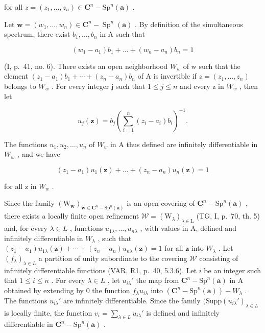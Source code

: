 for all \(z = (z_{1}, \ldots, z_{n}) \in \mathbf{C}^{n} - \mathrm{Sp}^{n}(\boldsymbol{a})\) .

Let \(\boldsymbol{w} = (w_{1}, \ldots, w_{n}) \in \mathbf{C}^{n} - \operatorname{Sp}^{n}(\boldsymbol{a})\) . By definition of the simultaneous spectrum, there exist \(b_{1}, \ldots, b_{n}\) in A such that

\[
(w _ {1} - a _ {1}) b _ {1} + \dots + (w _ {n} - a _ {n}) b _ {n} = 1
\]

(I, p.~41, no. 6). There exists an open neighborhood \(W_{w}\) of w such that the element \((z_{1}-a_{1})b_{1}+\cdots+(z_{n}-a_{n})b_{n}\) of A is invertible if \(z=(z_{1},\ldots,z_{n})\) belongs to \(W_{w}\) . For every integer j such that \(1\leqslant j\leqslant n\) and every z in \(W_{w}\) , then let

\[
u _ {j} (\boldsymbol {z}) = b _ {j} \left(\sum_ {i = 1} ^ {n} (z _ {i} - a _ {i}) b _ {i}\right) ^ {- 1}.
\]

The functions \(u_{1}, u_{2}, \ldots, u_{n}\) of \(W_{w}\) in A thus defined are infinitely differentiable in \(W_{w}\) , and we have

\[
(z _ {1} - a _ {1}) u _ {1} (\boldsymbol {z}) + \dots + (z _ {n} - a _ {n}) u _ {n} (\boldsymbol {z}) = 1
\]

for all z in \(W_{w}\) .

Since the family \((\mathrm{W}_{\boldsymbol{w}})_{\boldsymbol{w}\in\mathbf{C}^{n}-\mathrm{Sp}^{n}(\boldsymbol{a})}\) is an open covering of \(\mathbf{C}^{n}-\mathrm{Sp}^{n}(\boldsymbol{a})\) , there exists a locally finite open refinement \(\mathscr{W}=(\mathrm{W}_{\lambda})_{\lambda\in\mathrm{L}}\) (TG, I, p.~70, th. 5) and, for every \(\lambda\in L\) , functions \(u_{1\lambda},\ldots,u_{n\lambda}\) , with values in A, defined and infinitely differentiable in \(W_{\lambda}\) , such that \((z_{1}-a_{1})u_{1\lambda}(\boldsymbol{z})+\cdots+(z_{n}-a_{n})u_{n\lambda}(\boldsymbol{z})=1\) for all \(\boldsymbol{z}\) into \(W_{\lambda}\) . Let \((f_{\lambda})_{\lambda \in L}\) a partition of unity subordinate to the covering \(\mathscr{W}\) consisting of infinitely differentiable functions (VAR, R1, p.~40, 5.3.6). Let \(i\) be an integer such that \(1 \leqslant i \leqslant n\) . For every \(\lambda \in L\) , let \(u_{i\lambda}'\) the map from \(\mathbf{C}^n - \mathrm{Sp}^n(\boldsymbol{a})\) in A obtained by extending by 0 the function \(f_{\lambda}u_{i\lambda}\) into \((\mathbf{C}^n - \mathrm{Sp}^n(\boldsymbol{a})) - W_{\lambda}\) . The functions \(u_{i\lambda}'\) are infinitely differentiable. Since the family \((\mathrm{Supp}(u_{i\lambda}')_{\lambda \in L}\) is locally finite, the function \(v_i = \sum_{\lambda \in L} u_{i\lambda}'\) is defined and infinitely differentiable in \(\mathbf{C}^n - \mathrm{Sp}^n(\boldsymbol{a})\) .

